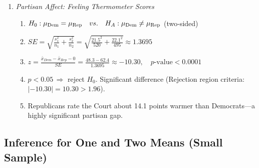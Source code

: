 \documentclass{article}
\begin{document}
\begin{enumerate}
\item \emph{Partisan Affect: Feeling Thermometer Scores}
\begin{enumerate}[label=(\alph*)]
  \item
    $H_0:\mu_{\rm Dem}=\mu_{\rm Rep}\quad vs.\quad H_A:\mu_{\rm Dem}\neq\mu_{\rm Rep}$ (two‐sided)
  \item
    $SE=\sqrt{\frac{s_1^2}{n_1}+\frac{s_2^2}{n_2}}=\sqrt{\frac{21.5^2}{520}+\frac{22.1^2}{495}}\approx1.3695$
  \item
    $z=\frac{\bar x_{Dem} - \bar x_{Rep}  - 0}{SE}=\frac{48.3-62.4}{1.3695}\approx-10.30,\quad p\text{-value}<0.0001$
  \item
    $p<0.05\, \Rightarrow$ reject $H_0$.  Significant difference (Rejection region criteria: $|-10.30|=10.30>1.96$).
  \item
    Republicans rate the Court about 14.1 points warmer than Democrats—a highly significant partisan gap.
\end{enumerate}

\end{enumerate} %



\subsection{Inference for One and Two Means (Small Sample)}
\end{document}
